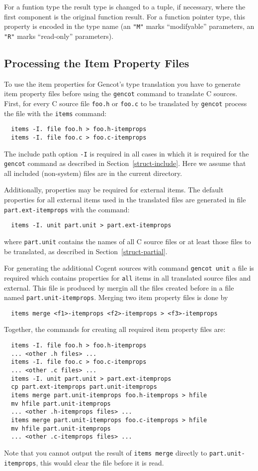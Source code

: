 \documentclass[a4paper]{report}
\newcommand{\code}[1]{\textnormal{\texttt{#1}}}
\begin{document}
For a funtion type the result type is changed to a tuple, if necessary, where the first component is the original 
function result. For a function pointer type, this property is encoded in the type name (an \code{"M"} marks 
``modifyable'' parameters, an \code{"R"} marks ``read-only'' parameters).

\subsection{Processing the Item Property Files}
\label{types-dfltprops-process}

To use the item properties for Gencot's type translation you have to generate item property files before using the 
\code{gencot} command to translate C sources. First, for every C source file \code{foo.h} or \code{foo.c} 
to be translated by \code{gencot} process the file with the \code{items} command:
\begin{verbatim}
  items -I. file foo.h > foo.h-itemprops
  items -I. file foo.c > foo.c-itemprops
\end{verbatim}
The include path option \code{-I} is required in all cases in which it is required for the \code{gencot} command as 
described in Section~\ref{struct-include}. Here we assume that all included (non-system) files are in the current 
directory.

Additionally, properties may be required for external items. The default properties for all external items used in the 
translated files are generated in file \code{part.ext-itemprops} with the command:
\begin{verbatim}
  items -I. unit part.unit > part.ext-itemprops
\end{verbatim}
where \code{part.unit} contains the names of all C source files or at least those files to be translated, as described 
in Section~\ref{struct-partial}.

For generating the additional Cogent sources with command \code{gencot unit} a file is required which contains properties
for \code{all} items in all translated source files and external. This file is produced by mergin all the files created 
before in a file named \code{part.unit-itemprops}. Merging two item property files is done by 
\begin{verbatim}
  items merge <f1>-itemprops <f2>-itemprops > <f3>-itemprops
\end{verbatim}

Together, the commands for creating all required item property files are:
\begin{verbatim}
  items -I. file foo.h > foo.h-itemprops
  ... <other .h files> ...
  items -I. file foo.c > foo.c-itemprops
  ... <other .c files> ...
  items -I. unit part.unit > part.ext-itemprops
  cp part.ext-itemprops part.unit-itemprops
  items merge part.unit-itemprops foo.h-itemprops > hfile
  mv hfile part.unit-itemprops
  ... <other .h-itemprops files> ...
  items merge part.unit-itemprops foo.c-itemprops > hfile
  mv hfile part.unit-itemprops  
  ... <other .c-itemprops files> ...
\end{verbatim}
Note that you cannot output the result of \code{items merge} directly to \code{part.unit-itemprops},
this would clear the file before it is read.
\end{document}
